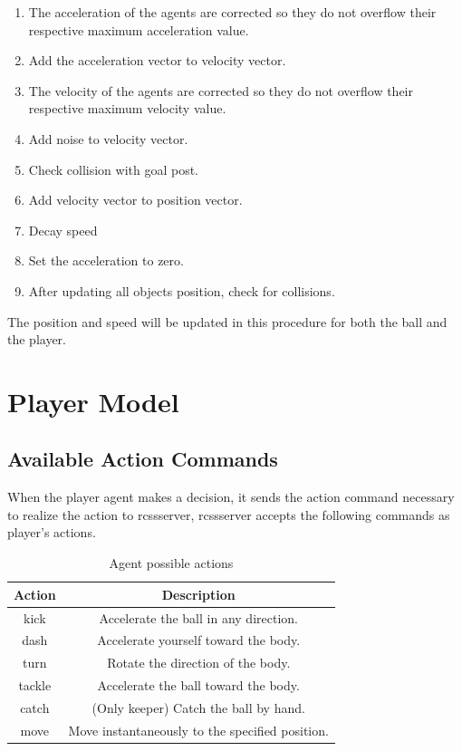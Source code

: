 \begin{enumerate}
	\item The acceleration of the agents are corrected so they do not overflow their respective maximum acceleration value.
	\item Add the acceleration vector to  velocity vector.
	\item The velocity of the agents are corrected so they do not overflow their respective maximum velocity value.
	\item Add noise to velocity vector.
	\item Check collision with goal post.
	\item Add velocity vector to  position vector.
	\item Decay speed
	\item Set the acceleration to zero.
	\item After updating all objects position, check for collisions.
\end{enumerate}

The position and speed will be updated in this procedure for both the ball and the
player.



\section{Player Model}

\subsection{Available Action Commands}
When the player agent makes a decision, it sends the action command necessary to realize  the  action  to  rcssserver,  rcssserver  accepts  the  following  commands  as player's actions.

\begin{table}
\caption{Agent possible actions}
\label{AgentActions}

\center
\begin{tabular}{cc}
  \hline
	Action & Description   \\
	\hline
    kick  & Accelerate the ball in any direction.  \\
    dash  & Accelerate yourself toward the body.\\
	turn  & Rotate the direction of the body.\\
	tackle& Accelerate the ball toward the body.\\
	catch & (Only keeper) Catch the ball by hand.\\
	move  & Move instantaneously to the specified position.\\
	\hline
\end{tabular}
\end{table}


